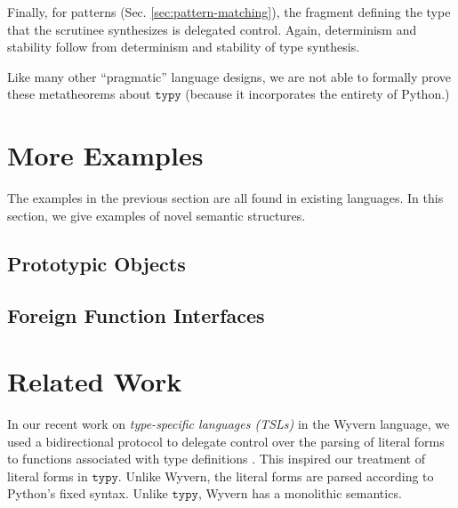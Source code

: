 \documentclass[preprint,10pt]{sigplanconf}
\newcommand{\typy}{\texttt{typy}}
\begin{document}
Finally, for patterns (Sec. \ref{sec:pattern-matching}), the fragment defining the type that the scrutinee synthesizes is delegated control. Again, determinism and stability follow from determinism and stability of type synthesis.

Like many other ``pragmatic'' language designs, we are not able to formally prove these metatheorems about $\typy$ (because it incorporates the entirety of Python.) 

\section{More Examples}\label{sec:more-examples}
The examples in the previous section are all found in existing languages. In this section, we give examples of novel semantic structures.

\subsection{Prototypic Objects}

\subsection{Foreign Function Interfaces}

\section{Related Work}\label{related}\label{sec:related-work}

%




In our recent work on \emph{type-specific languages (TSLs)} in the Wyvern language, we used a bidirectional protocol to delegate control over the parsing of literal forms to functions associated with type definitions \cite{TSLs,sac15}. This inspired our treatment of literal forms in $\typy$. Unlike Wyvern, the literal forms are parsed according to Python's fixed syntax. Unlike $\typy$, Wyvern has a monolithic semantics. %
\end{document}
